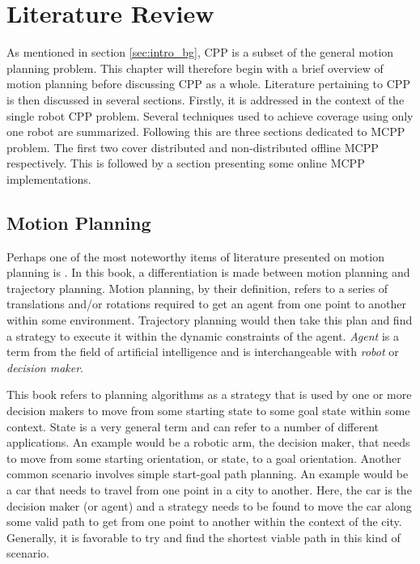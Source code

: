 \chapter{Literature Review}
\label{chp:back}
As mentioned in section \ref{sec:intro_bg}, \acl{CPP} is a subset of the general motion planning problem. This chapter will therefore begin with a brief overview of motion planning before discussing \acs{CPP} as a whole. Literature pertaining to \acs{CPP} is then discussed in several sections. Firstly, it is addressed in the context of the single robot \acs{CPP} problem. Several techniques used to achieve coverage using only one robot are summarized. Following this are three sections dedicated to \acf{MCPP} problem. The first two cover distributed and non-distributed offline \acs{MCPP} respectively. This is followed by a section presenting some online \acs{MCPP} implementations.

\section{Motion Planning}
Perhaps one of the most noteworthy items of literature presented on motion planning is \cite{Lavalle2006}. In this book, a differentiation is made between motion planning and trajectory planning. Motion planning, by their definition, refers to a series of translations and/or rotations required to get an agent from one point to another within some environment. Trajectory planning would then take this plan and find a strategy to execute it within the dynamic constraints of the agent. \emph{Agent} is a term from the field of artificial intelligence and is interchangeable with \emph{robot} or \emph{decision maker}.

This book refers to planning algorithms as a strategy that is used by one or more decision makers to move from some starting state to some goal state within some context. State is a very general term and can refer to a number of different applications. An example would be a robotic arm, the decision maker, that needs to move from some starting orientation, or state, to a goal orientation. Another common scenario involves simple start-goal path planning. An example would be a car that needs to travel from one point in a city to another. Here, the car is the decision maker (or agent) and a strategy needs to be found to move the car along some valid path to get from one point to another within the context of the city. Generally, it is favorable to try and find the shortest viable path in this kind of scenario.

